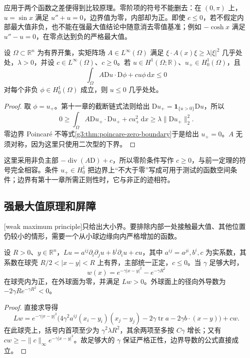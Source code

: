 应用于两个函数之差便得到比较原理。零阶项的符号不能删去：在 \((0,\pi)\) 上，\(u=\sin x\) 满足 \(u''+u=0\)，边界值为零，内部却为正。即使 \(c\le0\)，若不假定内部最大值非负，也不能在强最大值结论中随意消去零值基准；例如 \(-\cosh x\) 满足 \(u''-u=0\)，在零点达到负的严格最大值。

\begin{proposition}\label{g3:prop:weak-maximum-energy}
	设 \(\Omega\subset\mathbb R^n\) 为有界开集，实矩阵场 \(A\in L^\infty(\Omega)\) 满足
	\(\xi\cdot A(x)\xi\ge\lambda|\xi|^2\) 几乎处处，\(\lambda>0\)，并设 \(c\in L^\infty(\Omega)\)、\(c\ge0\)。若 \(u\in H^1(\Omega;\mathbb R)\)、\(u_+\in H_0^1(\Omega)\)，且
	\[
		\int_\Omega A\mathrm Du\cdot\mathrm D\phi+cu\phi\,\mathrm dx\le0
	\]
	对每个非负 \(\phi\in H_0^1(\Omega)\) 成立，则 \(u\le0\) 几乎处处。
\end{proposition}
\begin{proof}
	取 \(\phi=u_+\)。第十一章的截断链式法则给出 \(\mathrm Du_+=\mathbf1_{\{u>0\}}\mathrm Du\)，所以
	\[
		0\ge\int_\Omega A\mathrm Du_+\cdot\mathrm Du_++c u_+^2\,\mathrm dx
		\ge\lambda\|\mathrm Du_+\|_2^2.
	\]
	零边界 Poincaré 不等式\cref{g3:thm:poincare-zero-boundary}于是给出 \(u_+=0\)。\(A\) 无须对称，因为这里只使用二次型的下界。
\end{proof}

这里采用非负主部 \(-\operatorname{div}(A\mathrm D)+c\)，所以零阶条件写作 \(c\ge0\)，与前一定理的符号完全相容。条件 \(u_+\in H_0^1\) 把边界上“不大于零”写成可用于测试的函数空间条件；边界有第十一章所需正则性时，它与非正的迹相符。

\subsection{强最大值原理和屏障}
\label{g3:subsec:1207:02}
[weak maximum principle]只给出大小界。要排除内部一处接触最大值、其他位置仍较小的情形，需要一个从小球边缘向内严格增加的函数。

\begin{lemma}\label{g3:lem:exponential-annular-barrier}
	设 \(R>0\)、\(y\in\mathbb R^n\)，\(Lu=a^{ij}\partial_i\partial_ju+b^i\partial_i u+cu\)，其中 \(a^{ij}=a^{ji},b^i,c\) 为实系数，其系数在球壳 \(R/2<|x-y|<R\) 上有界，主部统一正定，\(c\le0\)。当 \(\gamma\) 足够大时，
	\[
		w(x)=e^{-\gamma|x-y|^2}-e^{-\gamma R^2}
	\]
	在球壳内为正，在外球面为零，并满足 \(Lw>0\)。外球面上的径向外导数为 \(-2\gamma R e^{-\gamma R^2}<0\)。
\end{lemma}
\begin{proof}
	直接求导得
	\[
		Lw=e^{-\gamma|x-y|^2}
		\bigl(4\gamma^2 a^{ij}(x_i-y_i)(x_j-y_j)
		-2\gamma\operatorname{tr}a-2\gamma b\cdot(x-y)\bigr)+cw.
	\]
	在此球壳上，括号内首项至少为 \(\gamma^2\lambda R^2\)，其余两项至多按 \(C\gamma\) 增长；又有 \(cw\ge-\|c\|_\infty e^{-\gamma|x-y|^2}\)。故足够大的 \(\gamma\) 保证严格正性，边界导数的公式直接成立。
\end{proof}

